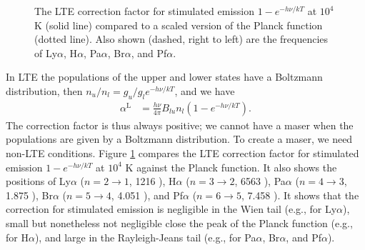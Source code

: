 \begin{figure}
\centering

\caption{The LTE correction factor for stimulated emission $1 -
e^{-h\nu/kT}$ at $10^4$ K (solid line) compared to a scaled
version of the Planck function (dotted line). Also shown (dashed, right to left) are
the frequencies of Ly$\alpha$, H$\alpha$, Pa$\alpha$,
Br$\alpha$, and Pf$\alpha$.}
\label{figure-stimulated-emssion}
\end{figure}

In LTE the populations of the upper and lower states have a
Boltzmann distribution, then $n_u / n_l = g_u/g_l
e^{-h\nu/kT}$, and we have
\begin{align}
\alpha^\mathrm{L} &= \frac{h\nu}{4\pi} B_{lu} n_l 
(1 - e^{-h\nu/kT}).
\end{align}
The correction factor is thus always positive; we cannot
have a maser when the populations are given by a Boltzmann
distribution. To create a maser, we need non-LTE conditions.
Figure \ref{figure-stimulated-emssion} compares the LTE
correction factor for stimulated emission $1 - e^{-h\nu/kT}$
at $10^4$ K against the Planck function. It also shows the
positions of Ly$\alpha$ ($n = 2\rightarrow1$, 1216 {\Angstrom}),
H$\alpha$ ($n=3\rightarrow2$, 6563 {\Angstrom}), Pa$\alpha$
($n=4\rightarrow3$, 1.875 {\micron}), Br$\alpha$ ($n=5\rightarrow4$, 4.051
{\micron}), and Pf$\alpha$ ($n=6\rightarrow5$, 7.458 {\micron}). It
shows that the correction for stimulated emission is
negligible in the Wien tail (e.g., for Ly$\alpha$), small
but nonetheless not negligible close the peak of the Planck
function (e.g., for H$\alpha$), and large in the
Rayleigh-Jeans tail (e.g., for Pa$\alpha$, Br$\alpha$, and
Pf$\alpha$).

